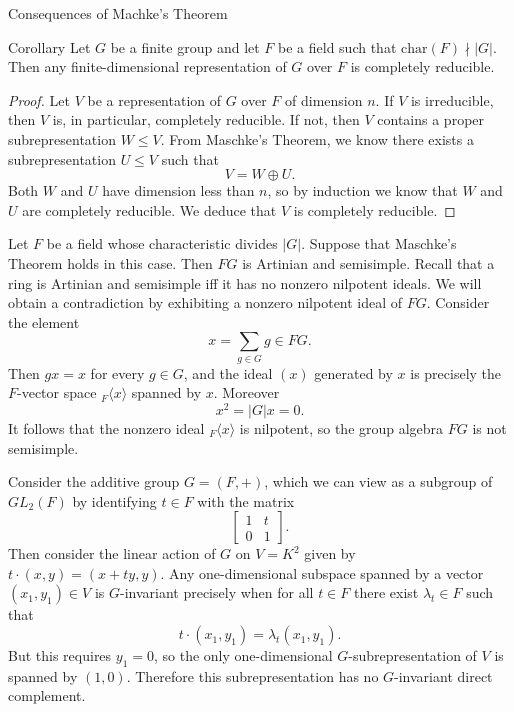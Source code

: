 \begin{frame}{Consequences of Machke's Theorem}
\begin{block}{Corollary}
Let $G$ be a finite group and let $F$ be a field such that $\text{char}(F) \nmid |G|$. Then any finite-dimensional representation of $G$ over $F$ is completely reducible.
\end{block}
\begin{proof}
Let $V$ be a representation of $G$ over $F$ of dimension $n$.  If $V$ is irreducible, then $V$ is, in particular, completely reducible.  If not, then $V$ contains a proper subrepresentation $W \leq V$.  From Maschke's Theorem, we know there exists a subrepresentation $U \leq V$ such that 
\begin{equation}  V = W \oplus U. \end{equation}
Both $W$ and $U$ have dimension less than $n$, so by induction we know that $W$ and $U$ are completely reducible. We deduce that $V$ is completely reducible.
\end{proof}
\end{frame}


\begin{frame}
\begin{example}
Let $F$ be a field whose characteristic divides $|G|$. Suppose that Maschke's Theorem holds in this case.  Then $FG$ is Artinian and semisimple.  Recall that a ring is Artinian and semisimple iff it has no nonzero nilpotent ideals.  We will obtain a contradiction by exhibiting a nonzero nilpotent ideal of $FG$. Consider the element \[x =  \sum_{g \in G} g \in FG.  \] Then $g x =x$ for every $g \in G$, and the ideal $(x)$ generated by $x$ is precisely the $F$-vector space $_{F} \langle x \rangle$ spanned by $x$.  Moreover \[x^2 = |G| x = 0. \]  It follows that the nonzero ideal $_{F} \langle x \rangle$ is nilpotent, so the group algebra $FG$ is not semisimple. 
\end{example}
\end{frame}

\begin{frame}[plain]
\begin{example}
Consider the additive group $G = (F, +)$, which we can view as a subgroup of $GL_2 (F)$ by identifying $t \in F$ with the matrix 
\[ \begin{bmatrix} 1 & t \\ 0 & 1 \end{bmatrix}.\]
Then consider the linear action of $G$ on $V = K^2$ given by $t \cdot (x, y) = (x + ty, y)$. Any one-dimensional subspace spanned by a vector $(x_1, y_1) \in V$ is $G$-invariant precisely when for all $t \in F$ there exist $\lambda_t \in F$ such that \[ t \cdot (x_1, y_1) = \lambda_t (x_1, y_1). \]  But this requires $y_1=0$, so the only one-dimensional $G$-subrepresentation of $V$ is spanned by $(1,0)$. Therefore this subrepresentation has no $G$-invariant direct complement. 
\end{example}
\end{frame}



